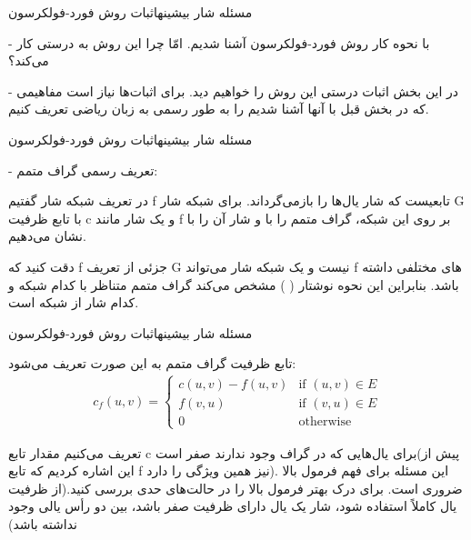 \begin{itemframe}{مسئله شار بیشینه}{اثبات روش فورد-فولکرسون}
\item[-]
با نحوه کار روش فورد-فولکرسون آشنا شدیم. امّا چرا این روش به درستی کار می‌کند؟
\item[-]
در این بخش اثبات درستی این روش را خواهیم دید. برای اثبات‌ها نیاز است مفاهیمی که در بخش قبل با آنها آشنا شدیم را به طور رسمی به زبان ریاضی تعریف کنیم.
\end{itemframe}

\begin{itemframe}{مسئله شار بیشینه}{اثبات روش فورد-فولکرسون}
\item[-]
تعریف رسمی گراف متمم:
\item
در تعریف شبکه شار گفتیم f تابعیست که شار یال‌ها را بازمی‌گرداند. برای شبکه شار G با تابع ظرفیت c و یک شار مانند f بر روی این شبکه، گراف متمم را با
و شار آن را با
 نشان می‌دهیم.
\item
 دقت کنید که f جزئی از تعریف G نیست و یک شبکه شار می‌تواند f های مختلفی داشته باشد. بنابراین این نحوه نوشتار (
) مشخص می‌کند گراف متمم متناظر با کدام شبکه و کدام شار از شبکه است.
\end{itemframe}

\begin{itemframe}{مسئله شار بیشینه}{اثبات روش فورد-فولکرسون}
\item
تابع ظرفیت گراف متمم به این صورت تعریف می‌شود:
\begin{align}
c_f(u, v)=
\begin{cases}
c(u, v) - f(u, v) & \text{if } (u, v) \in E\\
f(v, u) & \text{if } (v, u) \in E\\
0 & \text{otherwise}
\end{cases}
\label{res-net-cap}
\end{align}

\item
تعریف می‌کنیم مقدار تابع c برای یال‌هایی که در گراف وجود ندارند صفر است(پیش از این اشاره کردیم که تابع f نیز همین ویژگی را دارد). این مسئله برای فهم فرمول بالا ضروری است. برای درک بهتر فرمول بالا را در حالت‌های حدی بررسی کنید.(از ظرفیت یال کاملاً استفاده شود، شار یک یال دارای ظرفیت صفر باشد، بین دو رأس یالی وجود نداشته باشد)

\end{itemframe}

